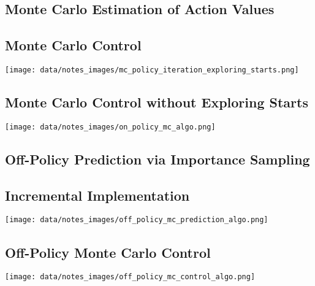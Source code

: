 \subsection{Monte Carlo Estimation of Action Values}

\subsection{Monte Carlo Control}
\texttt{[image: data/notes\_images/mc\_policy\_iteration\_exploring\_starts.png]}

\subsection{Monte Carlo Control without Exploring Starts}
\texttt{[image: data/notes\_images/on\_policy\_mc\_algo.png]}

\subsection{Off-Policy Prediction via Importance Sampling}


\subsection{Incremental Implementation}
\texttt{[image: data/notes\_images/off\_policy\_mc\_prediction\_algo.png]}


\subsection{Off-Policy Monte Carlo Control}
\texttt{[image: data/notes\_images/off\_policy\_mc\_control\_algo.png]}


